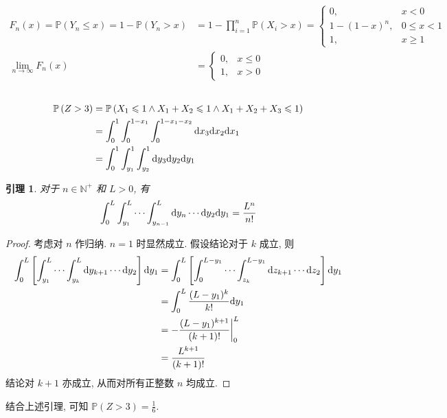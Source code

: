 \documentclass[8pt]{article}
\theoremstyle{compact}
\newtheorem{lemma}{引理}
\def\le{\leqslant}
\def\ge{\geqslant}
\def\P#1{\mathbb{P}\left({#1}\right)}
\begin{document}
\subsection{}
\begin{equation}
	\begin{split}
		F_n(x) = \P{Y_n \le x} = 1 - \P{Y_n > x} &= 1 - \prod_{i=1}^{n}\P{X_i > x} = \begin{cases}
			0, & x < 0\\
			1 - (1 - x)^n, & 0 \le x < 1\\
			1, & x \ge 1
		\end{cases}\\
		\lim_{n \to \infty}F_n(x) &= \begin{cases}
			0, & x \le 0 \\
			1, & x > 0
		\end{cases}
	\end{split}
\end{equation}
\subsection{}
\begin{equation}
	\begin{split}
		\P{Z > 3} &= \P{X_1 \le 1 \wedge X_1 + X_2 \le 1 \wedge X_1 + X_2 + X_3 \le 1}\\
		&= \int_{0}^{1}\int_{0}^{1 - x_1}\int_{0}^{1 - x_1 - x_2}\text dx_3 \text dx_2 \text dx_1\\
		&= \int_{0}^{1}\int_{y_1}^{1}\int_{y_2}^{1}\text dy_3 \text dy_2 \text dy_1
	\end{split}
\end{equation}

\begin{lemma}
	对于 $n \in \mathbb N^+$ 和 $L > 0$, 有\begin{equation}
		\int_{0}^{L}\int_{y_1}^{L}\cdots\int_{y_{n-1}}^{L}\text dy_n\cdots\text dy_2\text dy_1 = \frac{L^n}{n!}
	\end{equation}
\end{lemma}
\begin{proof}
	考虑对 $n$ 作归纳. $n = 1$ 时显然成立. 假设结论对于 $k$ 成立, 则
	\begin{equation}
		\begin{split}
			\int_{0}^{L}\left[\int_{y_1}^{L}\cdots\int_{y_k}^{L}\text dy_{k+1}\cdots\text dy_2\right]\text dy_1 &= \int_{0}^{L}\left[\int_{0}^{L - y_1}\cdots\int_{z_k}^{L - y_1}\text dz_{k+1}\cdots\text dz_2\right]\text dy_1\\
			&= \int_{0}^{L}\frac{(L - y_1)^k}{k!}\text dy_1\\
			&= -\frac{(L - y_1)^{k+1}}{(k+1)!}\bigg|_{0}^{L}\\
			&= \frac{L^{k+1}}{(k+1)!}
		\end{split}
	\end{equation}
	结论对 $k + 1$ 亦成立, 从而对所有正整数 $n$ 均成立.
\end{proof}

结合上述引理, 可知 $\P{Z > 3} = \frac16$.

\section{}
\end{document}
